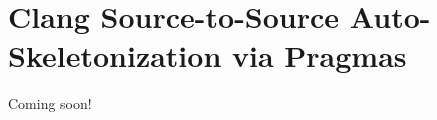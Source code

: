 
\chapter{Clang Source-to-Source Auto-Skeletonization via Pragmas}
\label{clangTutorial}

Coming soon!

